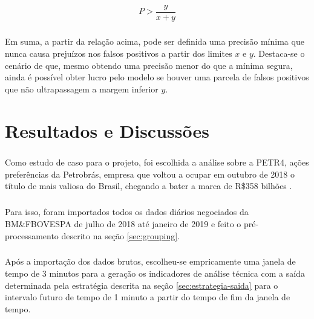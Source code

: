 \documentclass[grad,numbers]{coppe}
\begin{document}
                \begin{equation}\label{eq:precisao-minima}
                    P > \frac{y}{x + y}
                \end{equation}
                
                \paragraph{}Em suma, a partir da relação acima, pode ser definida uma precisão mínima que nunca causa prejuízos nos falsos positivos a partir dos limites $x$ e $y$. Destaca-se o cenário de que, mesmo obtendo uma precisão menor do que a mínima segura, ainda é possível obter lucro pelo modelo se houver uma parcela de falsos positivos que não ultrapassagem a margem inferior $y$.
                
                
                
    \chapter{Resultados e Discussões}
    
        \paragraph{}Como estudo de caso para o projeto, foi escolhida a análise sobre a PETR4, ações preferências da Petrobrás, empresa que voltou a ocupar em outubro de 2018 o título de mais valiosa do Brasil, chegando a bater a marca de R\$358 bilhões \cite{petr4-intro}. 
        
        \paragraph{}Para isso, foram importados todos os dados diários negociados da BM\&FBOVESPA de julho de 2018 até janeiro de 2019 e feito o pré-processamento descrito na seção \ref{sec:grouping}.
        
        \paragraph{}Após a importação dos dados brutos, escolheu-se empricamente uma janela de tempo de 3 minutos para a geração os indicadores de análise técnica com a saída determinada pela estratégia descrita na seção \ref{sec:estrategia-saida} para o intervalo futuro de tempo de 1 minuto a partir do tempo de fim da janela de tempo. 
        
\end{document}
